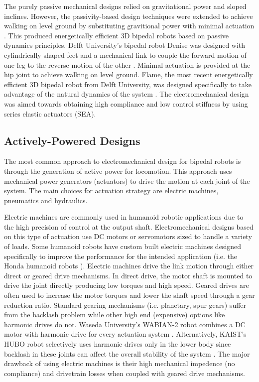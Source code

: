 The purely passive mechanical designs relied on gravitational power and sloped inclines. However, the passivity-based design techniques were extended to achieve walking on level ground by substituting gravitional power with minimal actuation \cite{Collins:2005vp}. This produced energetically efficient 3D bipedal robots based on passive dynamics principles. Delft University's bipedal robot Denise was designed with cylindrically shaped feet and a mechanical link to couple the forward motion of one leg to the reverse motion of the other \cite{Anderson:2005cw}. Minimal actuation is provided at the hip joint to achieve walking on level ground. Flame, the most recent energetically efficient 3D bipedal robot from Delft University, was designed specifically to take advantage of the natural dynamics of the system \cite{Hobbelen2008}. The electromechanical design was aimed towards obtaining high compliance and low control stiffness by using series elastic actuators (SEA). 


\subsection{Actively-Powered Designs} %
\label{sub:related_active_designs}
The most common approach to electromechanical design for bipedal robots is through the generation of active power for locomotion. This approach uses mechanical power generators (actuators) to drive the motion at each joint of the system. The main choices for actuation strategy are electric machines, pneumatics and hydraulics. 

Electric machines are commonly used in humanoid robotic applications due to the high precision of control at the output shaft. Electromechanical designs based on this type of actuation use DC motors or servomotors sized to handle a variety of loads. Some humanoid robots have custom built electric machines designed specifically to improve the performance for the intended application (i.e. the Honda humanoid robots \cite{Sakagami:2002cf,Hirai1998}). Electric machines drive the link motion through either direct or geared drive mechanisms. In direct drive, the motor shaft is mounted to drive the joint directly producing low torques and high speed. Geared drives are often used to increase the motor torques and lower the shaft speed through a gear reduction ratio. Standard gearing mechanisms (i.e. planetary, spur gears) suffer from the backlash problem while other high end (expensive) options like harmonic drives do not. Waseda University's WABIAN-2 robot combines a DC motor with harmonic drive for every actuation system \cite{Ogura:2006bm}. Alternatively, KAIST's HUBO robot selectively uses harmonic drives only in the lower body since backlash in these joints can affect the overall stability of the system \cite{IllWooPark:2005et}. The major drawback of using electric machines is their high mechanical impedence (no compliance) and drivetrain losses when coupled with geared drive mechanisms. 

